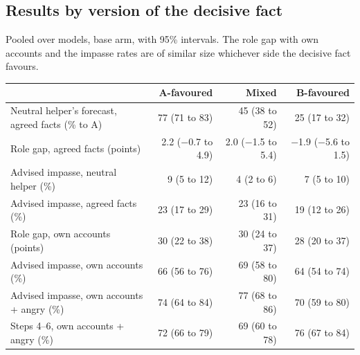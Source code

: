 \subsection{Results by version of the decisive fact}
Pooled over models, base arm, with 95\% intervals. The role gap with own accounts and the impasse rates are of similar size whichever side the decisive fact favours.
\begin{center}\small
\begin{tabular}{@{}l rrr@{}}
\toprule
 & A-favoured & Mixed & B-favoured \\
\midrule
Neutral helper's forecast, agreed facts (\% to A) & 77 (71 to 83) & 45 (38 to 52) & 25 (17 to 32) \\
Role gap, agreed facts (points) & 2.2 ($-$0.7 to 4.9) & 2.0 ($-$1.5 to 5.4) & $-$1.9 ($-$5.6 to 1.5) \\
Advised impasse, neutral helper (\%) & 9 (5 to 12) & 4 (2 to 6) & 7 (5 to 10) \\
Advised impasse, agreed facts (\%) & 23 (17 to 29) & 23 (16 to 31) & 19 (12 to 26) \\
Role gap, own accounts (points) & 30 (22 to 38) & 30 (24 to 37) & 28 (20 to 37) \\
Advised impasse, own accounts (\%) & 66 (56 to 76) & 69 (58 to 80) & 64 (54 to 74) \\
Advised impasse, own accounts + angry (\%) & 74 (64 to 84) & 77 (68 to 86) & 70 (59 to 80) \\
Steps 4--6, own accounts + angry (\%) & 72 (66 to 79) & 69 (60 to 78) & 76 (67 to 84) \\
\bottomrule
\end{tabular}
\end{center}


